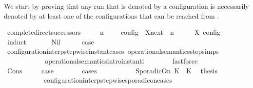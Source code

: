 \begin{isabellebody}
\begin{isamarkuptext}
  We start by proving that any run that is denoted by a configuration \isa{{\isasymS}}
  is necessarily denoted by at least one of the configurations that can be reached
  from \isa{{\isasymS}}.%
\end{isamarkuptext}\isamarkuptrue%
\isamarkupfalse%
\ complete{\isacharunderscore}direct{\isacharunderscore}successors{\isacharcolon}\isanewline
\ \ \ {\isacartoucheopen}{\isasymlbrakk}\ {\isasymGamma}{\isacharcomma}\ n\ {\isasymturnstile}\ {\isasymPsi}\ {\isasymtriangleright}\ {\isasymPhi}\ {\isasymrbrakk}\isactrlsub c\isactrlsub o\isactrlsub n\isactrlsub f\isactrlsub i\isactrlsub g\ {\isasymsubseteq}\ {\isacharparenleft}{\isasymUnion}X{\isasymin}{\isasymC}\isactrlsub n\isactrlsub e\isactrlsub x\isactrlsub t\ {\isacharparenleft}{\isasymGamma}{\isacharcomma}\ n\ {\isasymturnstile}\ {\isasymPsi}\ {\isasymtriangleright}\ {\isasymPhi}{\isacharparenright}{\isachardot}\ {\isasymlbrakk}\ X\ {\isasymrbrakk}\isactrlsub c\isactrlsub o\isactrlsub n\isactrlsub f\isactrlsub i\isactrlsub g{\isacharparenright}{\isacartoucheclose}\isanewline
%
\isadelimproof
\ \ %
\endisadelimproof
%
\isatagproof
{}\isamarkupfalse%
\ {\isacharparenleft}induct\ {\isasymPsi}{\isacharparenright}\isanewline
\ \ \ \ \isamarkupfalse%
\ Nil\isanewline
\ \ \ \ \isamarkupfalse%
\ {\isacharquery}case\isanewline
\ \ \ \ \ \ \isamarkupfalse%
\ configuration{\isacharunderscore}interp{\isacharunderscore}stepwise{\isacharunderscore}instant{\isacharunderscore}cases\ operational{\isacharunderscore}semantics{\isacharunderscore}step{\isachardot}simps\isanewline
\ \ \ \ \ \ \ \ \ \ \ \ operational{\isacharunderscore}semantics{\isacharunderscore}intro{\isachardot}instant{\isacharunderscore}i\isanewline
\ \ \ \ \ \ \isamarkupfalse%
\ fastforce\isanewline
\ \ \isamarkupfalse%
\isanewline
\ \ \ \ \isamarkupfalse%
\ {\isacharparenleft}Cons\ {\isasympsi}\ {\isasymPsi}{\isacharparenright}\ \ \isamarkupfalse%
\ {\isacharquery}case\isanewline
\ \ \ \ \ \ \isamarkupfalse%
\ {\isacharparenleft}cases\ {\isasympsi}{\isacharparenright}\isanewline
\ \ \ \ \ \ \ \ \isamarkupfalse%
\ {\isacharparenleft}SporadicOn\ K{}\ {\isasymtau}\ K{}{\isacharparenright}\ \isamarkupfalse%
\ {\isacharquery}thesis\ \isanewline
\ \ \ \ \ \ \ \ \ \ \isamarkupfalse%
\ configuration{\isacharunderscore}interp{\isacharunderscore}stepwise{\isacharunderscore}sporadicon{\isacharunderscore}cases\isanewline

\end{isabellebody}
